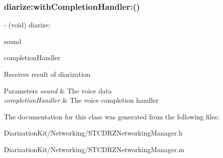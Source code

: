 \subsubsection{\texorpdfstring{diarize\+:with\+Completion\+Handler\+:()}{diarize:withCompletionHandler:()}}
{\footnotesize\ttfamily -\/ (void) diarize\+: \begin{DoxyParamCaption}\item[{(N\+S\+Data $\ast$)}]{sound }\item[{withCompletionHandler:(Completion\+Handler)}]{completion\+Handler }\end{DoxyParamCaption}}

Receives result of diarization 
\begin{DoxyParams}{Parameters}
{\em sound} & The voice data \\
\hline
{\em completion\+Handler} & The voice completion handler \\
\hline
\end{DoxyParams}


The documentation for this class was generated from the following files\+:\begin{DoxyCompactItemize}
\item 
Diarization\+Kit/\+Networking/S\+T\+C\+D\+R\+Z\+Networking\+Manager.\+h\item 
Diarization\+Kit/\+Networking/S\+T\+C\+D\+R\+Z\+Networking\+Manager.\+m\end{DoxyCompactItemize}
